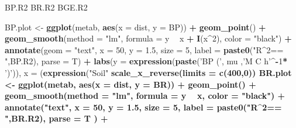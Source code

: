 \documentclass[]{article}
\newenvironment{Shaded}{\begin{snugshade}}{\end{snugshade}}
\newcommand{\KeywordTok}[1]{\textcolor[rgb]{0.13,0.29,0.53}{\textbf{#1}}}
\newcommand{\DataTypeTok}[1]{\textcolor[rgb]{0.13,0.29,0.53}{#1}}
\newcommand{\DecValTok}[1]{\textcolor[rgb]{0.00,0.00,0.81}{#1}}
\newcommand{\FloatTok}[1]{\textcolor[rgb]{0.00,0.00,0.81}{#1}}
\newcommand{\StringTok}[1]{\textcolor[rgb]{0.31,0.60,0.02}{#1}}
\newcommand{\OperatorTok}[1]{\textcolor[rgb]{0.81,0.36,0.00}{\textbf{#1}}}
\newcommand{\NormalTok}[1]{#1}
\begin{document}
\begin{Shaded}
\begin{Highlighting}[]
\NormalTok{BP.R2}
\NormalTok{BR.R2}
\NormalTok{BGE.R2}

\NormalTok{BP.plot <-}\StringTok{ }\KeywordTok{ggplot}\NormalTok{(metab, }\KeywordTok{aes}\NormalTok{(}\DataTypeTok{x =}\NormalTok{ dist, }\DataTypeTok{y =}\NormalTok{ BP)) }\OperatorTok{+}\StringTok{ }
\StringTok{  }\KeywordTok{geom_point}\NormalTok{() }\OperatorTok{+}\StringTok{ }
\StringTok{  }\KeywordTok{geom_smooth}\NormalTok{(}\DataTypeTok{method =} \StringTok{"lm"}\NormalTok{, }\DataTypeTok{formula =}\NormalTok{ y }\OperatorTok{~}\StringTok{ }\NormalTok{x }\OperatorTok{+}\StringTok{ }\KeywordTok{I}\NormalTok{(x}\OperatorTok{^}\DecValTok{2}\NormalTok{), }\DataTypeTok{color =} \StringTok{"black"}\NormalTok{) }\OperatorTok{+}
\StringTok{  }\KeywordTok{annotate}\NormalTok{(}\DataTypeTok{geom =} \StringTok{"text"}\NormalTok{, }\DataTypeTok{x =} \DecValTok{50}\NormalTok{, }\DataTypeTok{y =} \FloatTok{1.5}\NormalTok{, }\DataTypeTok{size =} \DecValTok{5}\NormalTok{, }\DataTypeTok{label =} \KeywordTok{paste0}\NormalTok{(}\StringTok{"R^2== "}\NormalTok{,BP.R2), }\DataTypeTok{parse =}\NormalTok{ T) }\OperatorTok{+}
\StringTok{  }\KeywordTok{labs}\NormalTok{(}\DataTypeTok{y =} \KeywordTok{expression}\NormalTok{(}\KeywordTok{paste}\NormalTok{(}\StringTok{'BP ('}\NormalTok{, mu ,}\StringTok{'M C h'}\OperatorTok{^-}\DecValTok{1}\OperatorTok{*}\StringTok{ ')'}\NormalTok{)), }
       \DataTypeTok{x =}\NormalTok{ (}\KeywordTok{expression}\NormalTok{(}\StringTok{"Soil"} \OperatorTok{%
\StringTok{  }\KeywordTok{scale_x_reverse}\NormalTok{(}\DataTypeTok{limits =} \KeywordTok{c}\NormalTok{(}\DecValTok{400}\NormalTok{,}\DecValTok{0}\NormalTok{))}
\NormalTok{BR.plot <-}\StringTok{ }\KeywordTok{ggplot}\NormalTok{(metab, }\KeywordTok{aes}\NormalTok{(}\DataTypeTok{x =}\NormalTok{ dist, }\DataTypeTok{y =}\NormalTok{ BR)) }\OperatorTok{+}\StringTok{ }
\StringTok{  }\KeywordTok{geom_point}\NormalTok{() }\OperatorTok{+}\StringTok{ }
\StringTok{  }\KeywordTok{geom_smooth}\NormalTok{(}\DataTypeTok{method =} \StringTok{"lm"}\NormalTok{, }\DataTypeTok{formula =}\NormalTok{ y }\OperatorTok{~}\StringTok{ }\NormalTok{x, }\DataTypeTok{color =} \StringTok{"black"}\NormalTok{) }\OperatorTok{+}\StringTok{ }
\StringTok{  }\KeywordTok{annotate}\NormalTok{(}\StringTok{"text"}\NormalTok{, }\DataTypeTok{x =} \DecValTok{50}\NormalTok{, }\DataTypeTok{y =} \FloatTok{1.5}\NormalTok{, }\DataTypeTok{size =} \DecValTok{5}\NormalTok{, }\DataTypeTok{label =} \KeywordTok{paste0}\NormalTok{(}\StringTok{"R^2== "}\NormalTok{,BR.R2), }\DataTypeTok{parse =}\NormalTok{ T ) }\OperatorTok{+}
}
\end{Highlighting}
\end{Shaded}
\end{document}
